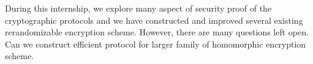 During this internship, we explore many aspect of security proof of the cryptographic protocols
and we have constructed and improved several existing rerandomizable encryption scheme.
However, there are many questions left open. Can we construct efficient protocol for larger family of homomorphic encryption scheme.
